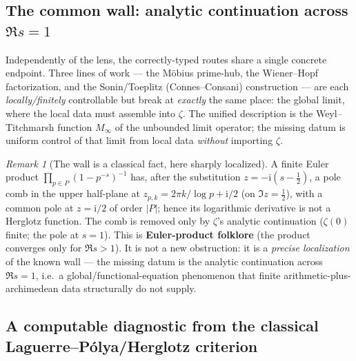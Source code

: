 \documentclass[12pt,a4paper]{article}
\theoremstyle{definition}
\theoremstyle{remark}
\newtheorem{remark}[theorem]{Remark}
\begin{document}
\subsection{The common wall: analytic continuation across $\Re s=1$}
\label{sec:common-wall-ac}

Independently of the lens, the correctly-typed routes share a single concrete
endpoint. Three lines of work --- the M\"obius prime-hub, the Wiener--Hopf
factorization, and the Sonin/Toeplitz (Connes--Consani) construction --- are each
\emph{locally/finitely} controllable but break at \emph{exactly} the same place:
the global limit, where the local data must assemble into $\zeta$. The unified
description is the Weyl--Titchmarsh function $M_\infty$ of the unbounded limit
operator; the missing datum is uniform control of that limit from local data
\emph{without} importing $\zeta$.

\begin{remark}[The wall is a classical fact, here sharply localized]
\label{rem:wall-folklore}
A finite Euler product $\prod_{p\in P}(1-p^{-s})^{-1}$ has, after the substitution
$z=-\mathrm{i}(s-\tfrac12)$, a pole comb in the upper half-plane at
$z_{p,k}=2\pi k/\log p+\mathrm{i}/2$ (on $\Im z=\tfrac12$), with a common pole at
$z=\mathrm{i}/2$ of order $|P|$; hence its logarithmic derivative is not a Herglotz
function. The comb is removed only by $\zeta$'s analytic continuation
($\zeta(0)$ finite; the pole at $s=1$). This is \textbf{Euler-product folklore}
(the product converges only for $\Re s>1$). It is not a new obstruction: it is a
\emph{precise localization} of the known wall --- the missing datum is the
analytic continuation across $\Re s=1$, i.e.\ a global/functional-equation
phenomenon that finite arithmetic-plus-archimedean data structurally do not
supply.
\end{remark}

\subsection{A computable diagnostic from the classical Laguerre--P\'olya/Herglotz criterion}
\label{sec:diagnostic}
\end{document}
